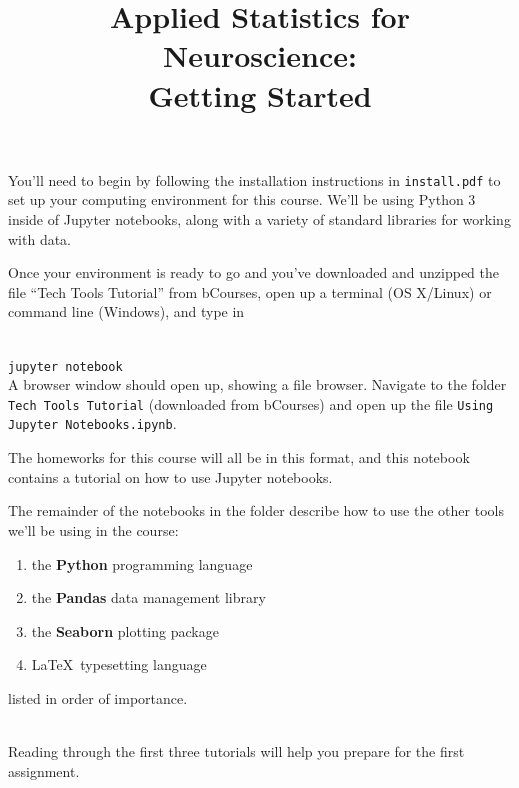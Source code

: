 \documentclass[twoside]{article}
\title{Applied Statistics for Neuroscience:\\
	Getting Started}
\begin{document}
\maketitle

You'll need to begin by following the installation instructions in
\texttt{install.pdf}
to set up your computing environment for this course.
We'll be using Python 3 inside of Jupyter notebooks,
along with a variety of standard libraries for working with data.

Once your environment is ready to go
and you've downloaded and unzipped
the file ``Tech Tools Tutorial'' from bCourses,
open up a terminal (OS X/Linux)
or command line (Windows),
and type in

\ \\
\texttt{jupyter notebook}
\ \\

A browser window should open up, showing a file browser.
Navigate to the folder \texttt{Tech Tools Tutorial}
(downloaded from bCourses)
and open up the file
\texttt{Using Jupyter Notebooks.ipynb}.

The homeworks for this course will all be in this format,
and this notebook contains a tutorial on how to use Jupyter notebooks.

The remainder of the notebooks in the folder describe how
to use the other tools we'll be using in the course:

\begin{enumerate}
\item the \textbf{Python} programming language
\item the \textbf{Pandas} data management library
\item the \textbf{Seaborn} plotting package
\item \LaTeX \ typesetting language
\end{enumerate}

listed in order of importance.

\ \\

Reading through the first three tutorials will help you
prepare for the first assignment.
\end{document}
